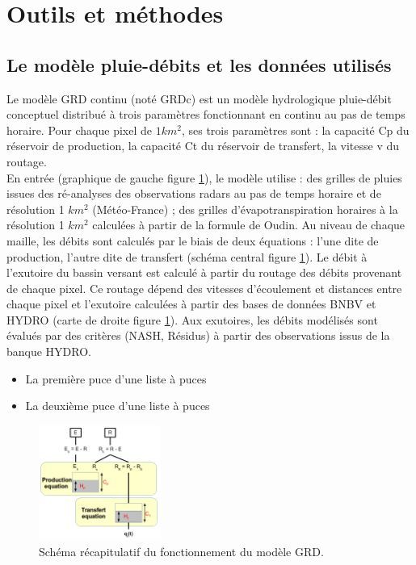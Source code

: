 \documentclass[a4paper,11pt]{article}
\begin{document}
\section{Outils et méthodes}


\subsection{Le modèle pluie-débits et les données utilisés}
Le modèle GRD continu (noté GRDc) est un modèle hydrologique pluie-débit conceptuel distribué à trois paramètres fonctionnant en continu au pas de temps horaire. Pour chaque pixel de $1 km^2$, ses trois paramètres sont : la capacité Cp du réservoir de production, la capacité Ct du réservoir de transfert, la vitesse v du routage.\\
En entrée (graphique de gauche figure \ref{fig:GRD}), le modèle utilise : des grilles de pluies issues des ré-analyses des observations radars au pas de temps horaire et de résolution 1 $km^2$ (Météo-France) ; des grilles d'évapotranspiration horaires à la résolution 1 $km^2$ calculées à partir de la formule de Oudin. Au niveau de chaque maille, les débits sont calculés par le biais de deux équations : l'une dite de production, l'autre dite de transfert (schéma central figure \ref{fig:GRD}). Le débit à l'exutoire du bassin versant est calculé à partir du routage des débits provenant de chaque pixel. Ce routage dépend des vitesses d'écoulement et distances entre chaque pixel et l'exutoire calculées à partir des bases de données BNBV et HYDRO (carte de droite figure \ref{fig:GRD}). Aux exutoires, les débits modélisés sont évalués par des critères (NASH, Résidus) à partir des observations issus de la banque HYDRO.\\


\begin{itemize}
    \item La première puce d'une liste à puces
    \item La deuxième puce d'une liste à puces
\end{itemize}

\begin{figure}[H]
  \begin{center}
     \includegraphics[width=4cm]{modele_grdc.png}
  \end{center}
  
  \caption{Schéma récapitulatif du fonctionnement du modèle GRD.}
  \label{fig:GRD}
\end{figure} 
\end{document}
